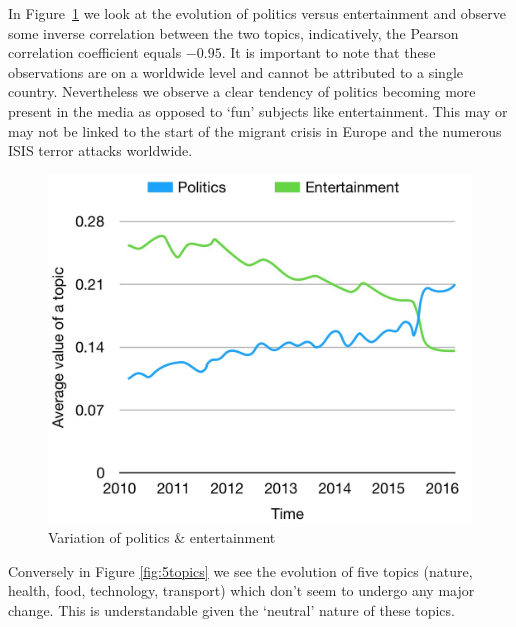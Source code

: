 \documentclass[11pt]{article}
\begin{document}
In Figure~\ref{fig:2topics} we look at the evolution of politics versus entertainment and observe some inverse correlation between the two topics, indicatively, the Pearson correlation coefficient equals $-0.95$. It is important to note that these observations are on a worldwide level and cannot be attributed to a single country. Nevertheless we observe a clear tendency of politics becoming more present in the media as opposed to `fun' subjects like entertainment. This may or may not be linked to the start of the migrant crisis in Europe and the numerous ISIS terror attacks worldwide.
\begin{figure}[htbp!]
    \centering
    \includegraphics[width=\linewidth]{images/polandent.jpg}
    \caption{Variation of politics \& entertainment}
    \label{fig:2topics}
\end{figure}

Conversely in Figure \ref{fig:5topics} we see the evolution of five topics (nature, health, food, technology, transport) which don't seem to undergo any major change. This is understandable given the `neutral' nature of these topics.
\end{document}
